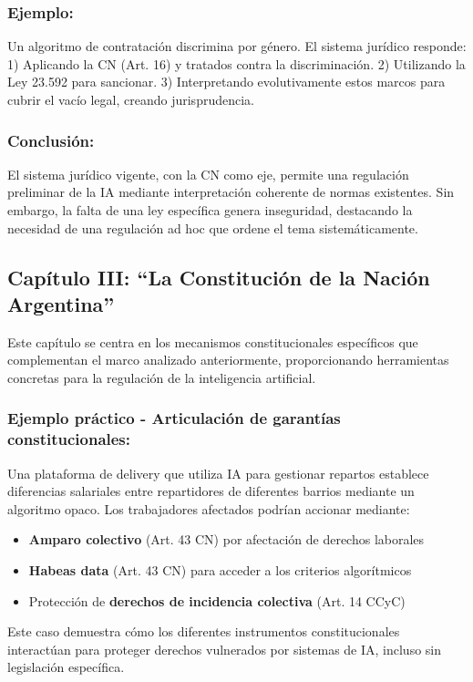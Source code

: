 \documentclass[10pt, a4paper]{article}
\begin{document}
\subsubsection*{Ejemplo:}
Un algoritmo de contratación discrimina por género. El sistema jurídico responde:
1) Aplicando la CN (Art. 16) y tratados contra la discriminación.
2) Utilizando la Ley 23.592 para sancionar.
3) Interpretando evolutivamente estos marcos para cubrir el vacío legal, creando jurisprudencia.

\subsubsection*{Conclusión:}
El sistema jurídico vigente, con la CN como eje, permite una regulación preliminar de la IA mediante interpretación coherente de normas existentes. Sin embargo, la falta de una ley específica genera inseguridad, destacando la necesidad de una regulación ad hoc que ordene el tema sistemáticamente.
\subsection{Capítulo III: ``La Constitución de la Nación Argentina''}
\label{subsec:constitucion}

Este capítulo se centra en los mecanismos constitucionales específicos que complementan el marco analizado anteriormente, proporcionando herramientas concretas para la regulación de la inteligencia artificial.

\subsubsection*{Ejemplo práctico - Articulación de garantías constitucionales:}
Una plataforma de delivery que utiliza IA para gestionar repartos establece diferencias salariales entre repartidores de diferentes barrios mediante un algoritmo opaco. Los trabajadores afectados podrían accionar mediante:
\begin{itemize}
    \item \textbf{Amparo colectivo} (Art. 43 CN) por afectación de derechos laborales
    \item \textbf{Habeas data} (Art. 43 CN) para acceder a los criterios algorítmicos
    \item Protección de \textbf{derechos de incidencia colectiva} (Art. 14 CCyC)
\end{itemize}

Este caso demuestra cómo los diferentes instrumentos constitucionales interactúan para proteger derechos vulnerados por sistemas de IA, incluso sin legislación específica.
\end{document}

